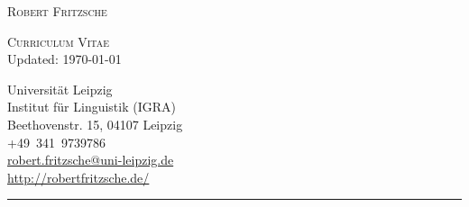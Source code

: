 \documentclass[11pt]{article}
\begin{document}
\pagestyle{empty}

\noindent\begin{minipage}{.48\textwidth}

\begin{flushleft}
\huge{\textsc{Robert Fritzsche}}
\vspace{.5\baselineskip}

\Large{\textsc{Curriculum Vitae}}\\
\vspace{\baselineskip}
\small{Updated: \today}
\end{flushleft}
\end{minipage}\hfill%
\begin{minipage}{.48\textwidth}
\begin{flushright}
	Universität Leipzig\\
	Institut für Linguistik (IGRA)\\
	Beethovenstr. 15, 04107 Leipzig\\
	+49~341~9739786 \\
	\href{mailto:robert.fritzsche@uni-leipzig.de}{robert.fritzsche@uni-leipzig.de} \\
	\href{http://robertfritzsche.de/}{http://robertfritzsche.de/}\\
\end{flushright}
\end{minipage}

\noindent\rule{\textwidth}{1pt}






\end{document}
